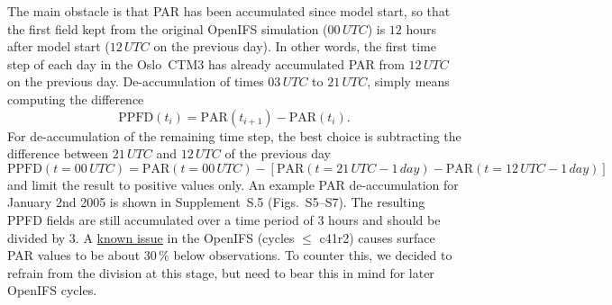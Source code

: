 \documentclass[gmd, manuscript]{copernicus}
\begin{document}
The main obstacle is that PAR has been accumulated since model start, so that the first field kept from the original OpenIFS simulation ($00\,\unit{UTC}$) is $12$ hours after model start ($12\,\unit{UTC}$ on the previous day). In other words, the first time step of each day in the Oslo~CTM3 has already accumulated PAR from $12\,\unit{UTC}$ on the previous day.
De-accumulation of times $03\,\unit{UTC}$ to $21\,\unit{UTC}$, simply means computing the difference
\begin{equation}
  \text{PPFD}(t_i) = \text{PAR}(t_{i+1})-\text{PAR}(t_i).
\end{equation}
For de-accumulation of the remaining time step, the best choice is subtracting the difference between $21\,\unit{UTC}$ and $12\,\unit{UTC}$ of the previous day
%
\begin{equation}
  \text{PPFD}(t=00\,\unit{UTC}) = \text{PAR}(t=00\,\unit{UTC}) - \left[\text{PAR}(t=21\,\unit{UTC}-1\,\unit{day})-\text{PAR}(t=12\,\unit{UTC}-1\,\unit{day})\right]
\end{equation}
%
and limit the result to positive values only. An example PAR de-accumulation for January 2nd 2005 is shown in Supplement~S.5 (Figs.~S5--S7).
The resulting PPFD fields are still accumulated over a time period of $3$ hours and should be divided by $3$. A \href{https://confluence.ecmwf.int/display/CKB/ERA-Interim\%3A+surface+photosynthetically+active+radiation+\%28surface+PAR\%29+values+are+too+low}{known issue} in the OpenIFS (cycles $\le$ c41r2) causes surface PAR values to be about $30\,\unit{\%}$ below observations. To counter this, we decided to refrain from the division at this stage, but need to bear this in mind for later OpenIFS cycles.

\end{document}

